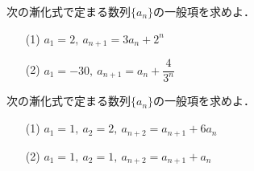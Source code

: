 \documentclass[a4paper,11pt]{ltjsarticle}
\begin{document}
\begin{toi}
次の漸化式で定まる数列$\{a_n\}$の一般項を求めよ．\\
\begin{minipage}{0.5\linewidth}
\begin{itemize}
    \item [(1)]$a_1=2,~a_{n+1}=3a_n+2^n$
\end{itemize}
\end{minipage}
\begin{minipage}{0.5\linewidth}
\begin{itemize}
    \item [(2)]$a_1=-30,~a_{n+1}=a_n+\dfrac{4}{3^n}$
\end{itemize}
\end{minipage}
\end{toi}
   \begin{toi}
次の漸化式で定まる数列$\{a_n\}$の一般項を求めよ．\\
\begin{minipage}{0.5\linewidth}
\begin{itemize}
    \item [(1)]    $a_1=1,~a_2=2,~a_{n+2}=a_{n+1}+6a_n$
\end{itemize}
\end{minipage}
\begin{minipage}{0.5\linewidth}
\begin{itemize}
    \item [(2)]$a_1=1,~a_2=1,~a_{n+2}=a_{n+1}+a_n$
\end{itemize}
\end{minipage}
\end{toi}
\end{document}
